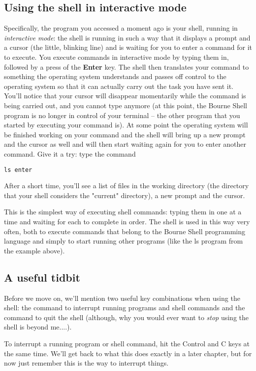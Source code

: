 \subsection{Using the shell in interactive mode}
Specifically, the program you accessed a moment ago is your shell, running in
\textit{interactive mode}: the shell is running in such a way that it displays
a prompt and a cursor (the little, blinking line) and is waiting for you to
enter a command for it to execute. You execute commands in interactive mode by
typing them in, followed by a press of the \textbf{Enter} key. The shell then
translates your command to something the operating system understands and
passes off control to the operating system so that it can actually carry out
the task you have sent it.  You'll notice that your cursor will disappear
momentarily while the command is being carried out, and you cannot type anymore
(at this point, the Bourne Shell program is no longer in control of your
terminal -- the other program that you started  by executing your command is).
At some point the operating system will be finished working on your command and
the shell will bring up a new prompt and the cursor as well and will then start
waiting again for you to enter another command. Give it a try: type the command
\scriptsize
\begin{verbatim}
ls enter
\end{verbatim}
\normalsize

After a short time, you'll see a list of files in the working directory (the
directory that your shell considers the "current" directory), a new prompt and
the cursor.

This is the simplest way of executing shell commands: typing them in one at a
time and waiting for each to complete in order. The shell is used in this way
very often, both to execute commands that belong to the Bourne Shell
programming language and simply to start running other programs (like the ls
program from the example above).

\subsection{A useful tidbit}
Before we move on, we'll mention two useful key combinations when using the
shell: the command to interrupt running programs and shell commands and the
command to quit the shell (although, why you would ever want to \textit{stop}
using the shell is beyond me....).

To interrupt a running program or shell command, hit the Control and C keys at
the same time. We'll get back to what this does exactly in a later chapter, but
for now just remember this is the way to interrupt things.

